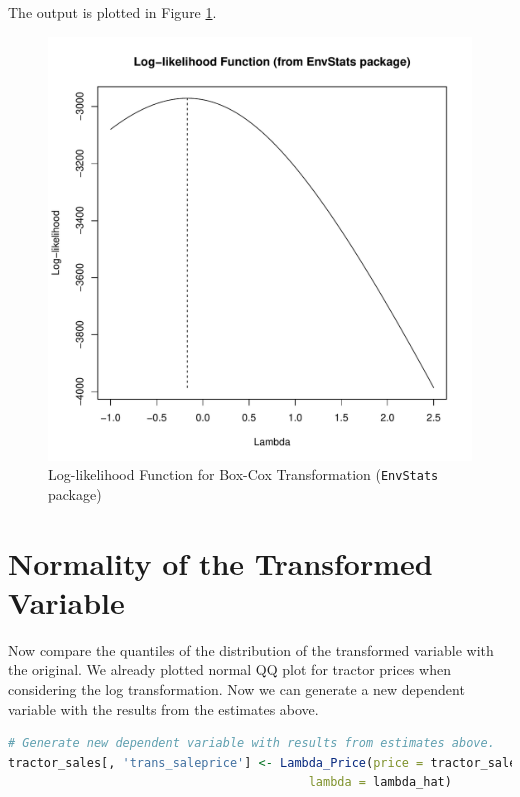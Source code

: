 \documentclass[11pt]{book}
\begin{document}
The output is plotted in Figure \ref{fig:plot_like_EnvStats}.

\begin{figure}[h!]
  \centering
  \includegraphics[scale = 0.5, keepaspectratio=true]{../Figures/plot_like_EnvStats}
  \caption{Log-likelihood Function for Box-Cox Transformation (\texttt{EnvStats} package)} \label{fig:plot_like_EnvStats}
\end{figure}






\clearpage
\section*{Normality of the Transformed Variable}

Now compare the quantiles of the distribution of the transformed variable with 
the original. 
We already plotted normal QQ plot for tractor prices when considering the log transformation.
Now we can generate a new dependent variable with the results from the estimates above.


\begin{lstlisting}[language=R]
# Generate new dependent variable with results from estimates above.
tractor_sales[, 'trans_saleprice'] <- Lambda_Price(price = tractor_sales[, 'saleprice'],
                                          lambda = lambda_hat)
\end{lstlisting}
\end{document}
